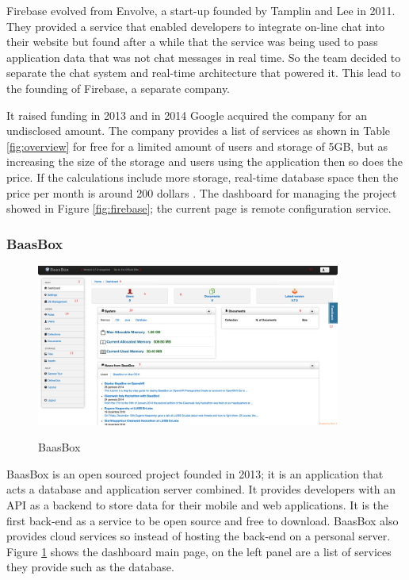Firebase \cite{firebase}  evolved from Envolve, a start-up founded by Tamplin and Lee in 2011. They provided a service that enabled developers to integrate on-line chat into their website but found after a while that the service was being used to pass application data that was not chat messages in real time. So the team decided to separate the chat system and real-time architecture that powered it. This lead to the founding of Firebase, a separate company.

It raised funding in 2013 and in 2014 Google acquired the company for an undisclosed amount. The company provides a list of services as shown in Table \ref{fig:overview} for free for a limited amount of users and storage of 5GB, but as increasing the size of the storage and users using the application then so does the price. If the calculations include more storage, real-time database space then the price per month is around 200 dollars \cite{firebase2}. The dashboard for managing the project showed in Figure \ref{fig:firebase}; the current page is remote configuration service.

\subsubsection{BaasBox}

\begin{figure}[!h]
    \caption{BaasBox}
    \centering
    \includegraphics[width=100mm]{images/baasbox}
    \label{fig:baasbox}
\end{figure}

BaasBox \cite{baasBox} is an open sourced project founded in 2013; it is an application that acts a database and application server combined. It provides developers with an API as a backend to store data for their mobile and web applications. It is the first back-end as a service to be open source and free to download. BaasBox also provides cloud services so instead of hosting the back-end on a personal server. Figure \ref{fig:baasbox} shows the dashboard main page, on the left panel are a list of services they provide such as the database.


